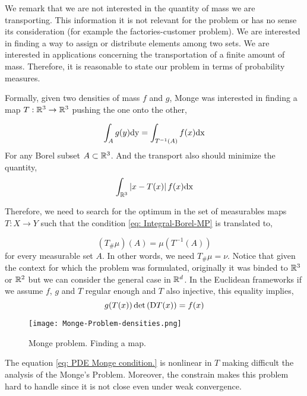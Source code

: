 We remark that we are not interested in the quantity of mass we are transporting. This information it is not relevant for the problem or has no sense its consideration (for example the factories-customer problem). We are interested in finding a way to assign or distribute elements among two sets. We are interested in applications concerning the transportation of a finite amount of mass. Therefore, it is reasonable to state our problem in terms of probability measures.  

Formally, given two densities of mass $f$ and $g$, Monge was interested in finding a map $T:\mathbb{R}^3\rightarrow\mathbb{R}^3$ pushing the one onto the other,

\begin{equation*}
	\int_A g(y) \mathrm{dy} = \int_{T^{-1}(A)} f(x) \mathrm{dx}  \label{eq: Integral-Borel-MP}
\end{equation*}
For any Borel subset $A\subset\mathbb{R}^3$. And the transport also should minimize the quantity, 
\begin{equation*}
	\int_{\mathbb{R}^3} \left| x-T(x) \right| f(x)\mathrm{dx}
\end{equation*}

Therefore, we need to search for the optimum in the set of measurables maps $T:X \rightarrow Y$ such that the condition \eqref{eq: Integral-Borel-MP} is translated to,

\begin{equation}
	(T_\#\mu)(A)=\mu(T^{-1}(A))
\end{equation}
for every measurable set $A$. In other words, we need $T_\# \mu = \nu$.  Notice that given the context for which the problem was formulated, originally it was binded to $\mathbb{R}^3$ or $\mathbb{R}^2$ but we can consider the general case in $\mathbb{R}^d$. In the Euclidean frameworks if we assume $f$, $g$ and $T$ regular enough and $T$ also injective, this equality implies,
\begin{equation}
	g(T(x))\det\left( \mathrm{D} T(x) \right)=f(x) \label{eq: PDE Monge condition.}
\end{equation} 
\begin{figure}[H]
	\centering
	\caption{Monge problem. Finding a map.}
	\texttt{[image: Monge-Problem-densities.png]}
\end{figure}

The equation \eqref{eq: PDE Monge condition.} is nonlinear in $T$ making difficult the analysis of the Monge's Problem. Moreover, the constrain makes this problem hard to handle since it is not close even under weak convergence. 



